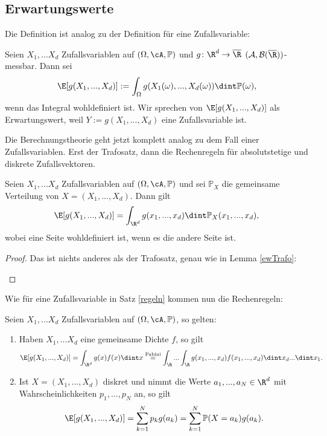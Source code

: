 \subsection*{Erwartungswerte}
Die Definition ist analog zu der Definition f\"ur eine Zufallsvariable:
\begin{deff}
	Seien $X_1,...X_d$ Zufallsvariablen auf $(\Omega, \cA, \mathbb{P})$ und $ g \colon \R^d \to \overline \R$ $(\mathcal A, \mathcal B(\overline \R))$-messbar. Dann sei 
	\[ \E[g(X_1,...,X_d)] := \int_{\Omega} g(X_1(\omega),...,X_d(\omega)) \dint \mathbb{P}(\omega), \]
	wenn das Integral wohldefiniert ist. Wir sprechen von $\E[g(X_1,...,X_d)]$ als Erwartungswert, weil $Y:= g(X_1,...,X_d)$ eine Zufallsvariable ist.
\end{deff}
Die Berechnungstheorie geht jetzt komplett analog zu dem Fall einer Zufallsvariablen. Erst der Trafosatz, dann die Rechenregeln f\"ur absolutstetige und diskrete Zufallsvektoren.
\begin{lemma}\label{gemVert}
	Seien $X_1,...X_d$ Zufallsvariablen auf $(\Omega, \cA, \mathbb{P})$ und sei $\mathbb{P}_X$ die gemeinsame Verteilung von $X = (X_1,...,X_d)$. Dann gilt \[ \E[g(X_1,...,X_d)] = \int_{\R^d} g(x_1,...,x_d) \dint \mathbb{P}_X(x_1,...,x_d), \]
	wobei eine Seite wohldefiniert ist, wenn es die andere Seite ist.
\end{lemma}

\begin{proof}
	Das ist nichts anderes als der Trafosatz, genau wie in Lemma \ref{ewTrafo}:
	\begin{center}		
	\end{center}
\end{proof}
Wie f\"ur eine Zufallsvariable in Satz \ref{regeln} kommen nun die Rechenregeln:
\begin{satz}[Berechnungsregeln]
Seien $X_1,...X_d$ Zufallsvariablen auf $(\Omega, \cA, \mathbb{P})$, so gelten:
	\begin{enumerate}[label=(\roman*)]
		\item Haben $X_1,...X_d$ eine gemeinsame Dichte $f$, so gilt 
		\[ \E[g(X_1,...,X_d)] = \int_{\R^d} g(x) f(x) \dint x \overset{\text{Fubini}}{=} \int_{\R} ... \int_{\R} g(x_1,...,x_d) f(x_1,...,x_d) \dint x_d ... \dint x_1.  \]
		\item Ist $X=(X_1,...,X_d)$ diskret und nimmt die Werte $a_1, ..., a_N\in\R^d$ mit Wahrscheinlichkeiten $p_1, ..., p_N$ an, so gilt \[ \E[g(X_1,...,X_d)]= \sum\limits_{k=1}^{N} p_k g(a_k) = \sum\limits_{k=1}^{N} \mathbb{P}(X=a_k) g(a_k) . \]
	\end{enumerate}
\end{satz}

